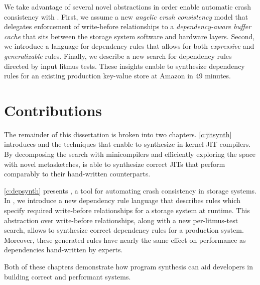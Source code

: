 We take advantage of several novel abstractions in order enable
automatic crash consistency with \depsynth.
First, we assume a new \textit{angelic crash consistency} model
that delegates enforcement of write-before relationships to a
\textit{dependency-aware buffer cache}
that sits between the storage system software and hardware layers.
Second, we introduce a language for dependency rules
that allows for both \textit{expressive} and \textit{generalizable} rules.
Finally, we describe a new search for dependency rules
directed by input litmus tests.
These insights enable \depsynth to synthesize dependency rules for an existing
production key-value store at Amazon in 49 minutes.

\section{Contributions}
The remainder of this dissertation is broken into two chapters.
\cref{c:jitsynth} introduces \jitsynth and the techniques that enable
\jitsynth to synthesize in-kernel JIT compilers.
By decomposing the search with minicompilers
and efficiently exploring the space with novel metasketches,
\jitsynth is able to synthesize correct JITs that perform
comparably to their hand-written counterparts.

\cref{c:depsynth} presents \depsynth, a tool for automating
crash consistency in storage systems. In ,
we introduce a new dependency rule language that describes rules
which specify required write-before relationships for a storage system
at runtime. This abstraction over write-before relationships, along
with a new per-litmus-test search, allows \depsynth to synthesize
correct dependency rules for a production system.
Moreover, these generated rules have nearly the same effect on performance
as dependencies hand-written by experts.

Both of these chapters demonstrate
how program synthesis can aid developers in building
correct and performant systems.

